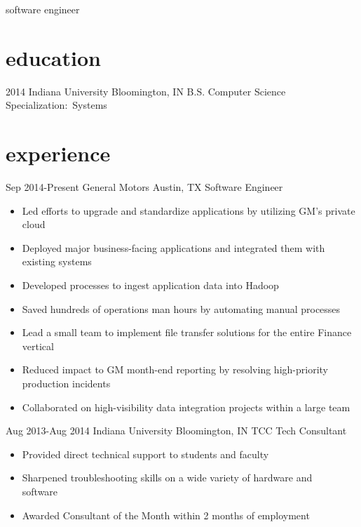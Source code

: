 \documentclass[]{friggeri-cv} %
\begin{document}
 
 
        {software engineer}





\section{education}

 \begin{entrylist}
  \entry
     {2014}
     {Indiana University}
     {Bloomington, IN}
     {B.S. Computer Science}
     {Specialization:~Systems}
    
 \end{entrylist}

 \section{experience}

 \begin{entrylist}
   \entry
     {Sep 2014-Present}
     {General Motors}
     {Austin, TX}
     {Software Engineer}
     {\begin{itemize}
         \item Led efforts to upgrade and standardize applications by utilizing GM's private cloud
         \item Deployed major business-facing applications and integrated them with existing systems
         \item Developed processes to ingest application data into Hadoop
         \item Saved hundreds of operations man hours by automating manual processes
         \item Lead a small team to implement file transfer solutions for the entire Finance vertical
         \item Reduced impact to GM month-end reporting by resolving high-priority production incidents
         \item Collaborated on high-visibility data integration projects within a large team
         

     \end{itemize}}
   \entry
     {Aug 2013-Aug 2014}
     {Indiana University}
     {Bloomington, IN}
     {TCC Tech Consultant}
     {\begin{itemize}
        \item Provided direct technical support to students and faculty
        \item Sharpened troubleshooting skills on a wide variety of hardware and \\software
        \item Awarded Consultant of the Month within 2 months of employment
     \end{itemize}
     }
 \end{entrylist}
\end{document}
